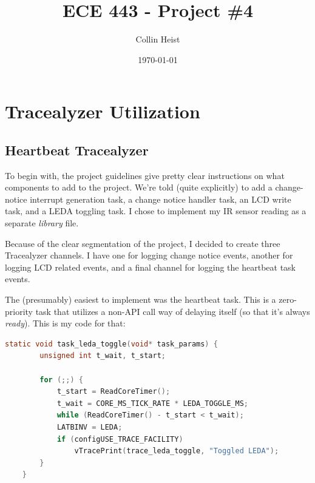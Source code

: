 \documentclass[a4paper, 12pt]{article}
\begin{document}
\title{ECE 443 - Project \#4}
\author{Collin Heist}
\date{\today}
\maketitle

\tableofcontents
\lstlistoflistings
\newpage
{}

\section{Tracealyzer Utilization}

\subsection{Heartbeat Tracealyzer}
To begin with, the project guidelines give pretty clear instructions on what components to add to the project. We're told (quite explicitly) to add a change-notice interrupt generation task, a change notice handler task, an LCD write task, and a LEDA toggling task. I chose to implement my IR sensor reading as a separate \emph{library} file. 

Because of the clear segmentation of the project, I decided to create three Tracealyzer channels. I have one for logging change notice events, another for logging LCD related events, and a final channel for logging the heartbeat task events.

The (presumably) easiest to implement was the heartbeat task. This is a zero-priority task that utilizes a non-API call way of delaying itself (so that it's always \emph{ready}). This is my code for that:

	\begin{mdframed}[backgroundcolor=code-gray, roundcorner=10pt,
								innerleftmargin=5, innertopmargin=5, innerbottommargin=5]	
	\begin{lstlisting}[language=C, caption=Heartbeat Task, tabsize=2, label={lst:task-leda-toggle}]
	static void task_leda_toggle(void* task_params) {
		unsigned int t_wait, t_start;
	
		for (;;) {
			t_start = ReadCoreTimer();
			t_wait = CORE_MS_TICK_RATE * LEDA_TOGGLE_MS;
			while (ReadCoreTimer() - t_start < t_wait);
			LATBINV = LEDA;
			if (configUSE_TRACE_FACILITY)
				vTracePrint(trace_leda_toggle, "Toggled LEDA");
		}
	}
	\end{lstlisting}
	\end{mdframed}
	
\end{document}
